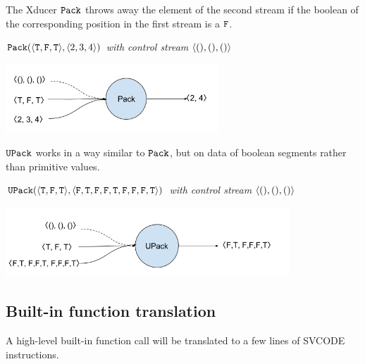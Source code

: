 The Xducer $\mathtt{Pack}$ throws away the element of the second stream if the boolean of the corresponding position in the first stream is a $\mathtt{F}$. 

\begin{example} \emph{$\pack({\<\T,\F,\T\'>}, \<2,3,4 \'>)$ with control stream $\< (),(), () \'>$}\\
	\begin{center}
		\includegraphics[width=0.6\textwidth]{fig/packxducer.png}
	\end{center}
\end{example}

$\mathtt{UPack}$ works in a way similar to $\mathtt{Pack}$, but on data of boolean segments rather than primitive values.
\begin{example} \emph{$\upack({\<\T,\F,\T\'>}, \< \F,\T, \F,\F,\T,\F,\F,\F, \T\'>)$ with control stream $\< (),(), () \'>$}\\
	\begin{center}
		\includegraphics[width=0.8\textwidth]{fig/upackxducer.png}
	\end{center}
\end{example}


\subsection{Built-in function translation}
A high-level built-in function call will be translated to a few lines of SVCODE instructions.


